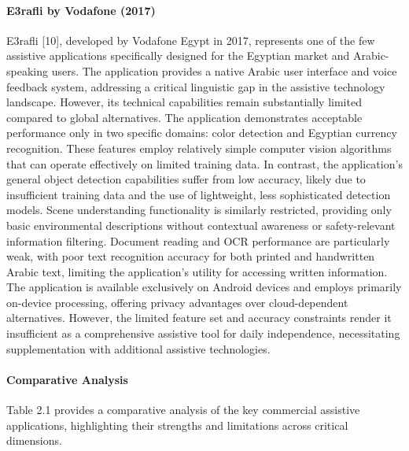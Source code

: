 \documentclass[12pt,a4paper]{report}
\begin{document}
\paragraph*{E3rafli by Vodafone (2017)}

E3rafli [10], developed by Vodafone Egypt in 2017, represents one of the few assistive applications specifically designed for the Egyptian market and Arabic-speaking users. The application provides a native Arabic user interface and voice feedback system, addressing a critical linguistic gap in the assistive technology landscape. However, its technical capabilities remain substantially limited compared to global alternatives. The application demonstrates acceptable performance only in two specific domains: color detection and Egyptian currency recognition. These features employ relatively simple computer vision algorithms that can operate effectively on limited training data. In contrast, the application's general object detection capabilities suffer from low accuracy, likely due to insufficient training data and the use of lightweight, less sophisticated detection models. Scene understanding functionality is similarly restricted, providing only basic environmental descriptions without contextual awareness or safety-relevant information filtering. Document reading and OCR performance are particularly weak, with poor text recognition accuracy for both printed and handwritten Arabic text, limiting the application's utility for accessing written information. The application is available exclusively on Android devices and employs primarily on-device processing, offering privacy advantages over cloud-dependent alternatives. However, the limited feature set and accuracy constraints render it insufficient as a comprehensive assistive tool for daily independence, necessitating supplementation with additional assistive technologies.

\paragraph*{Comparative Analysis}

Table 2.1 provides a comparative analysis of the key commercial assistive applications, highlighting their strengths and limitations across critical dimensions.
\end{document}
